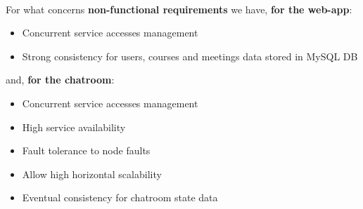\ \\
For what concerns \textbf{non-functional requirements} we have, \textbf{for the web-app}:
\begin{itemize}
    \item Concurrent service accesses management
    \item Strong consistency for users, courses and meetings data stored in MySQL DB
\end{itemize}
and, \textbf{for the chatroom}:
\begin{itemize}
    \item Concurrent service accesses management
    \item High service availability
    \item Fault tolerance to node faults
    \item Allow high horizontal scalability
    \item Eventual consistency for chatroom state data
\end{itemize}
\newpage
